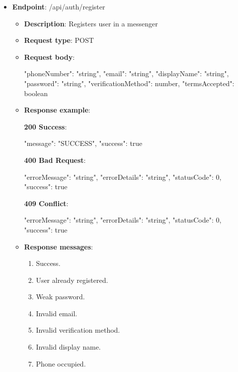 \begin{itemize}
    \item \textbf{Endpoint}: /api/auth/register
    \begin{itemize}
        \item \textbf{Description}: Registers user in a messenger
        \item \textbf{Request type}: POST
        \item \textbf{Request body}:
        \begin{spverbatim}
        {
            "phoneNumber": "string",
            "email": "string",
            "displayName": "string",
            "password": "string",
            "verificationMethod": number,
            "termsAccepted": boolean
        }
        \end{spverbatim}
        \item  \textbf{Response example}:

        \textbf{200 Success}:

        \begin{spverbatim}
        {
            "message": "SUCCESS",
            "success": true
        }
        \end{spverbatim}

        \textbf{400 Bad Request}:

        \begin{spverbatim}
        {
            "errorMessage": "string",
            "errorDetails": "string",
            "statusCode": 0,
            "success": true
        }
        \end{spverbatim}

        \textbf{409 Conflict}:

        \begin{spverbatim}
        {
            "errorMessage": "string",
            "errorDetails": "string",
            "statusCode": 0,
            "success": true
        }
        \end{spverbatim}
        \item \textbf{Response messages}:
        \begin{enumerate}
            \item Success.
            \item User already registered.
            \item Weak password.
            \item Invalid email.
            \item Invalid verification method.
            \item Invalid display name.
            \item Phone occupied.
        \end{enumerate}
    \end{itemize}


\end{itemize}
